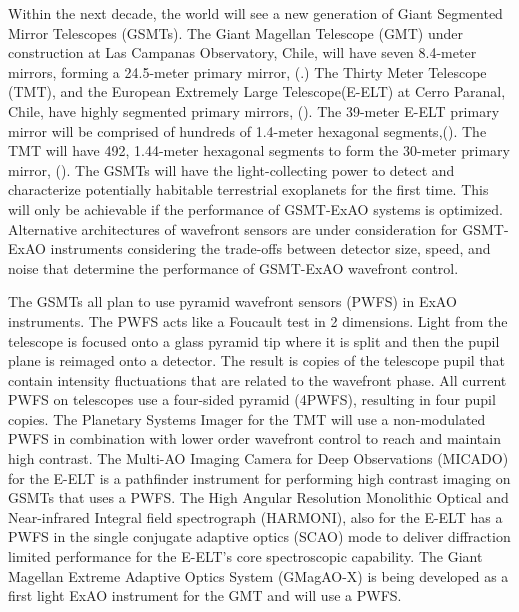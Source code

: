 Within the next decade, the world will see a new generation of Giant Segmented Mirror Telescopes (GSMTs). The Giant Magellan Telescope (GMT) under construction at Las Campanas Observatory, Chile, will have seven 8.4-meter mirrors, forming a 24.5-meter primary mirror, (\cite{fanson2020overview}.) The Thirty Meter Telescope (TMT), and the European Extremely Large Telescope(E-ELT) at Cerro Paranal, Chile, have highly segmented primary mirrors, (\cite{chisholm2020thirty}). The 39-meter E-ELT primary mirror will be comprised of hundreds of 1.4-meter hexagonal segments,(\cite{ramsay2020eso}). The TMT will have 492, 1.44-meter hexagonal segments to form the 30-meter primary mirror, (\cite{sanders2013thirty}). The GSMTs will have the light-collecting power to detect and characterize potentially habitable terrestrial exoplanets for the first time. This will only be achievable if the performance of GSMT-ExAO systems is optimized. Alternative architectures of wavefront sensors are under consideration for GSMT-ExAO instruments considering the trade-offs between detector size, speed, and noise that determine the performance of GSMT-ExAO wavefront control. 

 The GSMTs all plan to use pyramid wavefront sensors (PWFS) in ExAO instruments. The PWFS acts like a Foucault test in 2 dimensions. Light from the telescope is focused onto a glass pyramid tip where it is split and then the pupil plane is reimaged onto a detector. The result is copies of the telescope pupil that contain intensity fluctuations that are related to the wavefront phase. All current PWFS on telescopes use a four-sided pyramid (4PWFS), resulting in four pupil copies. The Planetary Systems Imager \cite{fitzgerald2019planetary} for the TMT will use a non-modulated PWFS\cite{guyon2018wavefront} in combination with lower order wavefront control to reach and maintain high contrast. The Multi-AO Imaging Camera for Deep Observations (MICADO)\cite{davies2018micado} for the E-ELT is a pathfinder instrument for performing high contrast imaging on GSMTs that uses a PWFS. The High Angular Resolution Monolithic Optical and Near-infrared Integral field spectrograph (HARMONI)\cite{neichel2016adaptive}, also for the E-ELT has a PWFS in the single conjugate adaptive optics (SCAO) mode to deliver diffraction limited performance for the E-ELT's core spectroscopic capability. The Giant Magellan Extreme Adaptive Optics System (GMagAO-X)\cite{males2019gmagao} is being developed as a first light ExAO instrument for the GMT and will use a PWFS.


